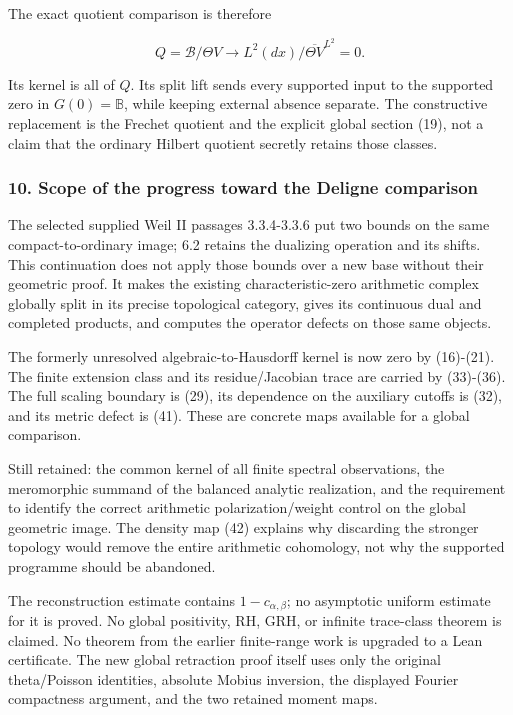 The exact quotient comparison is therefore

\[\boxed{Q=\mathscr B/\Theta V\longrightarrow
L^2(dx)/\overline{\Theta V}^{L^2}=0.}\tag{42}\]

Its kernel is all of \(Q\). Its split lift sends every supported input to the supported zero in
\(G(0)=\mathbb B\), while keeping external absence separate. The constructive replacement is the
Frechet quotient and the explicit global section (19), not a claim that the ordinary Hilbert
quotient secretly retains those classes.

\subsubsection{10. Scope of the progress toward the Deligne
comparison}\label{pr_10:scope-of-the-progress-toward-the-deligne-comparison}

The selected supplied Weil II passages 3.3.4-3.3.6 put two bounds on the same compact-to-ordinary
image; 6.2 retains the dualizing operation and its shifts. This continuation does not apply those
bounds over a new base without their geometric proof. It makes the existing characteristic-zero
arithmetic complex globally split in its precise topological category, gives its continuous dual and
completed products, and computes the operator defects on those same objects.

The formerly unresolved algebraic-to-Hausdorff kernel is now zero by (16)-(21). The finite extension
class and its residue/Jacobian trace are carried by (33)-(36). The full scaling boundary is (29),
its dependence on the auxiliary cutoffs is (32), and its metric defect is (41). These are concrete
maps available for a global comparison.

Still retained: the common kernel of all finite spectral observations, the meromorphic summand of
the balanced analytic realization, and the requirement to identify the correct arithmetic
polarization/weight control on the global geometric image. The density map (42) explains why
discarding the stronger topology would remove the entire arithmetic cohomology, not why the
supported programme should be abandoned.

The reconstruction estimate contains \(1-c_{\alpha,\beta}\); no asymptotic uniform estimate for it
is proved. No global positivity, RH, GRH, or infinite trace-class theorem is claimed. No theorem
from the earlier finite-range work is upgraded to a Lean certificate. The new global retraction
proof itself uses only the original theta/Poisson identities, absolute Mobius inversion, the
displayed Fourier compactness argument, and the two retained moment maps.

